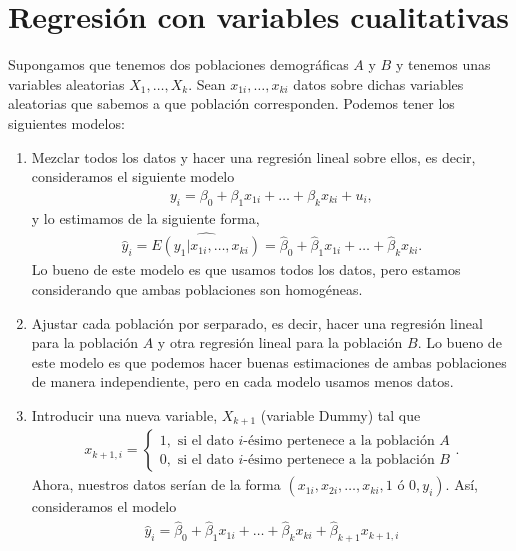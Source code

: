 \section{Regresión con variables cualitativas}
\noindent Supongamos que tenemos dos poblaciones demográficas $A$ y $B$ y tenemos unas variables aleatorias $X_1,\ldots,X_k$. Sean $x_{1i},\ldots,x_{ki}$ datos sobre dichas variables aleatorias que sabemos a que población corresponden. Podemos tener los siguientes modelos:
\begin{enumerate}
    \item Mezclar todos los datos y hacer una regresión lineal sobre ellos, es decir, consideramos el siguiente modelo
    \begin{align*}
        y_i = \beta_0 + \beta_1 x_{1i} +  \ldots + \beta_k x_{ki} + u_i,
    \end{align*}
    y lo estimamos de la siguiente forma,
    \begin{align*}
        \widehat{y}_i = \widehat{E(y_1 | x_{1i},\ldots,x_{ki})} = \widehat{\beta}_0 + \widehat{\beta}_1 x_{1i} + \ldots + \widehat{\beta}_k x_{ki}.
    \end{align*}
    Lo bueno de este modelo es que usamos todos los datos, pero estamos considerando que ambas poblaciones son homogéneas.
    \item Ajustar cada población por serparado, es decir, hacer una regresión lineal para la población $A$ y otra regresión lineal para la población $B$. Lo bueno de este modelo es que podemos hacer buenas estimaciones de ambas poblaciones de manera independiente, pero en cada modelo usamos menos datos.
    \item Introducir una nueva variable, $X_{k+1}$ (variable Dummy) tal que
    \begin{align*}
        x_{k+1,i} =  \begin{cases}
            1, \text{ si el dato $i$-ésimo pertenece a la población $A$} \\
            0, \text{ si el dato $i$-ésimo pertenece a la población $B$}
        \end{cases} .
    \end{align*}
    Ahora, nuestros datos serían de la forma $(x_{1i}, x_{2i},\ldots, x_{ki}, \text{1 ó 0},y_i)$. Así, consideramos el modelo
    \begin{align*}
        \widehat{y}_i = \widehat{\beta}_0 + \widehat{\beta}_1 x_{1i} + \ldots + \widehat{\beta}_k x_{ki} + \widehat{\beta}_{k+1}x_{k+1,i}
    \end{align*}
    \begin{itemize}

\end{itemize}
\end{enumerate}
